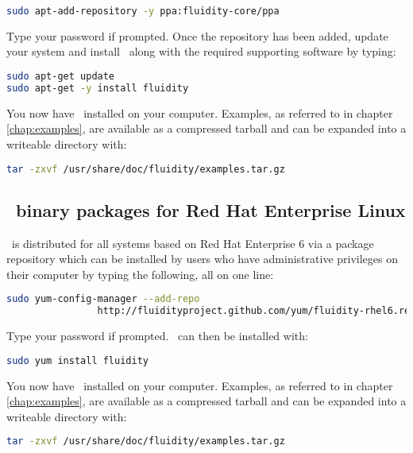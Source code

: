 \begin{lstlisting}[language=Bash]
sudo apt-add-repository -y ppa:fluidity-core/ppa
\end{lstlisting}

Type your password if prompted. Once the repository has been added, update your
system and install \fluidity\ along with the required supporting software by
typing:

\begin{lstlisting}[language=Bash]
sudo apt-get update
sudo apt-get -y install fluidity
\end{lstlisting}

You now have \fluidity\ installed on your computer. Examples, as referred to in
chapter \ref{chap:examples}, are available as a compressed tarball and can be
expanded into a writeable directory with:

\begin{lstlisting}[language=Bash]
tar -zxvf /usr/share/doc/fluidity/examples.tar.gz
\end{lstlisting}

\subsection{\fluidity\ binary packages for Red Hat Enterprise Linux}

\fluidity\ is distributed for all systems based on Red Hat Enterprise 6 via a
package repository which can be installed by users who have administrative
privileges on their computer by typing the following, all on one line:

\begin{lstlisting}[language=Bash]
sudo yum-config-manager --add-repo
                http://fluidityproject.github.com/yum/fluidity-rhel6.repo
\end{lstlisting}

Type your password if prompted. \fluidity\ can then be installed with:

\begin{lstlisting}[language=Bash]
sudo yum install fluidity
\end{lstlisting}

You now have \fluidity\ installed on your computer. Examples, as referred to in
chapter \ref{chap:examples}, are available as a compressed tarball and can be
expanded into a writeable directory with:

\begin{lstlisting}[language=Bash]
tar -zxvf /usr/share/doc/fluidity/examples.tar.gz
\end{lstlisting}

